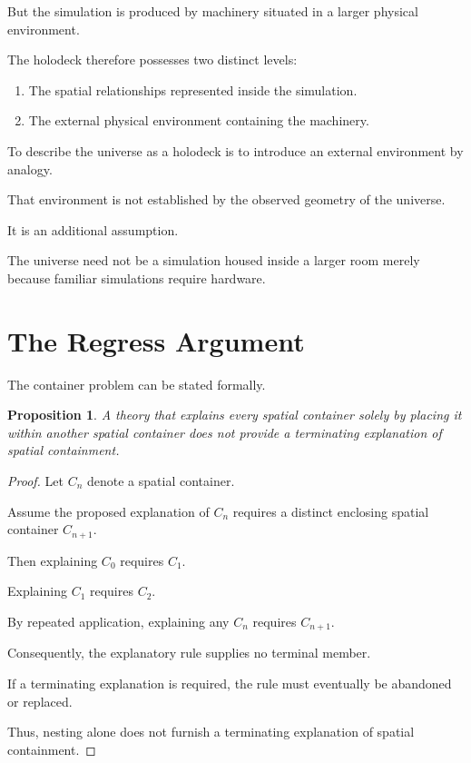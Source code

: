 \documentclass[12pt,onecolumn]{article}
\newtheorem{proposition}{Proposition}
\begin{document}
But the simulation is produced by machinery
situated in a larger physical environment.

The holodeck therefore possesses two distinct
levels:

\begin{enumerate}
\item The spatial relationships represented
inside the simulation.
\item The external physical environment containing
the machinery.
\end{enumerate}

To describe the universe as a holodeck is to
introduce an external environment by analogy.

That environment is not established by the
observed geometry of the universe.

It is an additional assumption.

The universe need not be a simulation housed
inside a larger room merely because familiar
simulations require hardware.

\section{The Regress Argument}

The container problem can be stated formally.

\begin{proposition}
A theory that explains every spatial container
solely by placing it within another spatial
container does not provide a terminating
explanation of spatial containment.
\end{proposition}

\begin{proof}
Let $C_n$ denote a spatial container.

Assume the proposed explanation of $C_n$
requires a distinct enclosing spatial container
$C_{n+1}$.

Then explaining $C_0$ requires $C_1$.

Explaining $C_1$ requires $C_2$.

By repeated application, explaining any
$C_n$ requires $C_{n+1}$.

Consequently, the explanatory rule supplies
no terminal member.

If a terminating explanation is required,
the rule must eventually be abandoned or
replaced.

Thus, nesting alone does not furnish a
terminating explanation of spatial containment.
\end{proof}
\end{document}
